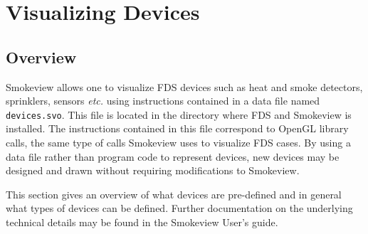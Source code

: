 %
%
\newcommand{\devicewidth}{1.5in}
\newcommand{\boxwidth}{2.5in}
\newcommand{\incgraphics}[1]{
\parbox[c]{\devicewidth}{
\vspace{0.01in}
\texttt{[image: \#1]}
\vspace{0.01in}
}
}


\section{Visualizing Devices}
\subsection{Overview}
Smokeview allows one to visualize FDS devices such as heat and smoke detectors,
sprinklers, sensors {\em etc.} using instructions contained in a
data file named {\tt devices.svo}.
This file is located in the directory where FDS and Smokeview is installed.
The instructions contained in this file correspond to OpenGL library calls,
the same type of calls Smokeview uses to visualize FDS cases.
By using a data file rather than program code to represent devices, new
devices may be designed and drawn without requiring modifications to Smokeview.



This section gives an overview of what devices are pre-defined and in general what types of devices can be defined.  Further documentation on the underlying technical details may be found in the Smokeview User's guide\cite{Smokeview_Users_Guide_5}.

